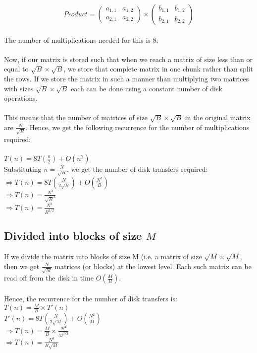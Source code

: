 \documentclass{article}
\begin{document}
\[
Product =
\begin{pmatrix}
  a_{1,1} & a_{1,2} \\
  a_{2,1} & a_{2,2} 
\end{pmatrix}\times
\begin{pmatrix}
  b_{1,1} & b_{1,2} \\
  b_{2,1} & b_{2,2} 
 \end{pmatrix}
\]
\\
The number of multiplications needed for this is $8$.\\
\\
Now, if our matrix is stored such that when we reach a matrix of size
less than or equal to $\sqrt{B} \times \sqrt{B}$, we store that
complete matrix in one chunk rather than split the rows. If we store
the matrix in such a manner than multiplying two matrices with sizes
$\sqrt{B} \times \sqrt{B}$ each can be done using a constant number of
disk operations.\\
\\
This means that the number of matrices of size $\sqrt{B} \times
\sqrt{B}$ in the original matrix are $\frac{N}{\sqrt{B}}$. Hence, we get the
following recurrence for the number of multiplications required:\\
\\
$T(n) = 8T(\frac{n}{2}) + O(n^2)$\\
Substituting $n = \frac{N}{\sqrt{B}}$, we get the number of disk
transfers required:\\
$\Rightarrow T(n) = 8T(\frac{N}{2\sqrt{B}}) + O(\frac{N^2}{B})$\\
$\Rightarrow T(n) = \frac{N^3}{\sqrt{B}^3}$\\
$\Rightarrow T(n) = \frac{N^3}{{B}^{3/2}}$

\subsection{Divided into blocks of size $M$}

If we divide the matrix into blocks of size M (i.e. a matrix of size
$\sqrt{M} \times \sqrt{M}$, then we get $\frac{N}{\sqrt{M}}$ matrices
(or blocks) at the lowest level. Each such matrix can be read off from
the disk in time $O(\frac{M}{B})$.\\
\\
Hence, the recurrence for the number of disk transfers is:\\
$T(n) = \frac{M}{B} \times T'(n)$\\
$T'(n) = 8T(\frac{N}{2\sqrt{M}}) + O(\frac{N^2}{M})$\\
$\Rightarrow T(n) = \frac{M}{B} \times \frac{N^3}{M^{3/2}}$\\
$\Rightarrow T(n) = \frac{N^3}{B\sqrt{M}}$
\end{document}

